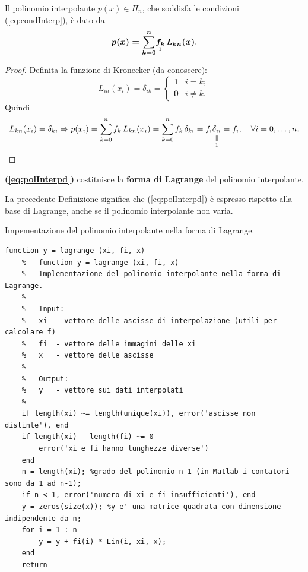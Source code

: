 \begin{theorem}
    Il polinomio interpolante $p(x)\in \Pi_n$, che soddisfa le condizioni (\ref{eq:condInterp}), è dato da 
    \begin{equation}\label{eq:polInterpd}
        \boldsymbol{p(x)=\sum_{k=0}^{n}} \underset{\footnotemark}{\boldsymbol{f_k}}\, \boldsymbol{L_{kn}(x)}.
    \end{equation}
\end{theorem}
\begin{proof}
    Definita la funzione di Kronecker (da conoscere): 
    \begin{equation}\label{eq:formaKronecker}
        L_{in}(x_i)=\delta_{ik} = 
        \begin{cases}
            \boldsymbol 1 & i=k;\\
            \boldsymbol 0 & i\neq k.
        \end{cases}
    \end{equation}
   Quindi
   \begin{equation*}
       L_{kn}(x_i)=\delta_{ki}\Rightarrow p(x_i)=\sum_{k=0}^n f_k\, L_{kn}(x_i) = \sum_{k=0}^n f_k\, \delta_{ki} = f_i \equalto{\delta_{ii}}{1} = f_i,\quad \forall i=0,\hdots,n.
   \end{equation*}
\end{proof}

\begin{definition}
    \textbf{(\ref{eq:polInterpd})} costituisce la \textbf{forma di Lagrange} del polinomio interpolante.
\end{definition}

La precedente Definizione significa che (\ref{eq:polInterpd}) è espresso rispetto alla base di Lagrange, anche se il polinomio interpolante non varia.

\begin{algorithm}
\caption{Impementazione del polinomio interpolante nella forma di Lagrange.}\label{alg:implPolIntFormaLagr}
    \begin{lstlisting}[style=Matlab-editor]
    function y = lagrange (xi, fi, x)
    %   function y = lagrange (xi, fi, x)
    %   Implementazione del polinomio interpolante nella forma di Lagrange.
    %
    %   Input:
    %   xi  - vettore delle ascisse di interpolazione (utili per calcolare f)
    %   fi  - vettore delle immagini delle xi
    %   x   - vettore delle ascisse
    %
    %   Output:
    %   y   - vettore sui dati interpolati
    %
    if length(xi) ~= length(unique(xi)), error('ascisse non distinte'), end
    if length(xi) - length(fi) ~= 0
        error('xi e fi hanno lunghezze diverse')
    end
    n = length(xi); %grado del polinomio n-1 (in Matlab i contatori sono da 1 ad n-1);
    if n < 1, error('numero di xi e fi insufficienti'), end 
    y = zeros(size(x)); %y e' una matrice quadrata con dimensione indipendente da n;
    for i = 1 : n
        y = y + fi(i) * Lin(i, xi, x);
    end
    return
    \end{lstlisting}
\end{algorithm}

